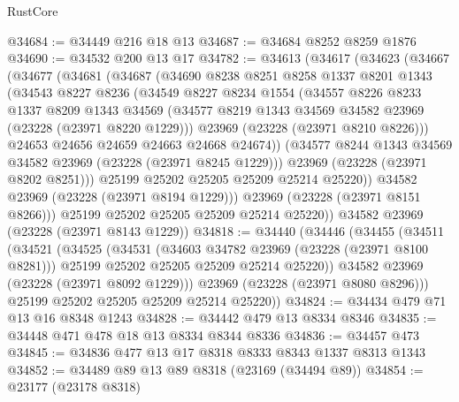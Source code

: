 \begin{lexlean}{RustCore}
\begin{coremodule}
@34684 := @34449 @216 @18 @13
@34687 := @34684 @8252 @8259 @1876
@34690 := @34532 @200 @13 @17
@34782 := @34613
    (@34617
      (@34623
        (@34667
          (@34677
            (@34681
              (@34687
                (@34690
                  @8238
                  @8251
                  @8258
                  @1337
                  @8201
                  @1343
                  (@34543
                    @8227
                    @8236
                    (@34549
                      @8227
                      @8234
                      @1554
                      (@34557
                        @8226
                        @8233
                        @1337
                        @8209
                        @1343
                        @34569
                        (@34577 @8219 @1343 @34569 @34582 @23969 (@23228 (@23971 @8220 @1229)))
                        @23969
                        (@23228 (@23971 @8210 @8226)))
                      @24653
                      @24656
                      @24659
                      @24663
                      @24668
                      @24674))
                  (@34577 @8244 @1343 @34569 @34582 @23969 (@23228 (@23971 @8245 @1229)))
                  @23969
                  (@23228 (@23971 @8202 @8251)))
                @25199
                @25202
                @25205
                @25209
                @25214
                @25220))
            @34582
            @23969
            (@23228 (@23971 @8194 @1229)))
          @23969
          (@23228 (@23971 @8151 @8266)))
        @25199
        @25202
        @25205
        @25209
        @25214
        @25220))
    @34582
    @23969
    (@23228 (@23971 @8143 @1229))
@34818 := @34440
    (@34446
      (@34455
        (@34511
          (@34521
            (@34525
              (@34531
                (@34603 @34782 @23969 (@23228 (@23971 @8100 @8281)))
                @25199
                @25202
                @25205
                @25209
                @25214
                @25220))
            @34582
            @23969
            (@23228 (@23971 @8092 @1229)))
          @23969
          (@23228 (@23971 @8080 @8296)))
        @25199
        @25202
        @25205
        @25209
        @25214
        @25220))
@34824 := @34434 @479 @71 @13 @16 @8348 @1243
@34828 := @34442 @479 @13 @8334 @8346
@34835 := @34448 @471 @478 @18 @13 @8334 @8344 @8336
@34836 := @34457 @473
@34845 := @34836 @477 @13 @17 @8318 @8333 @8343 @1337 @8313 @1343
@34852 := @34489 @89 @13 @89 @8318 (@23169 (@34494 @89))
@34854 := @23177 (@23178 @8318)

\end{coremodule}
\end{lexlean}
